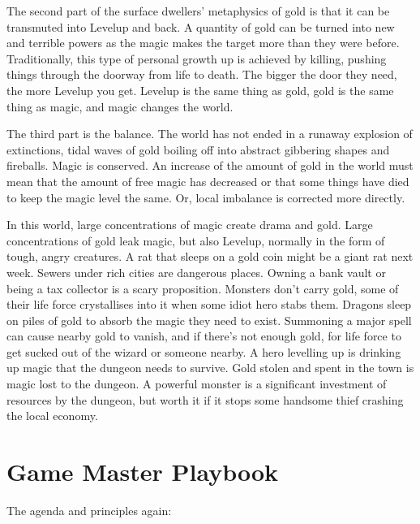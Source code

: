 \documentclass{tufte-book}
\begin{document}
The second part of the surface dwellers' metaphysics of gold is that it can be transmuted into Levelup and back. A quantity of gold can be turned into new and terrible powers as the magic makes the target more than they were before. Traditionally, this type of personal growth up is achieved by killing, pushing things through the doorway from life to death. The bigger the door they need, the more Levelup you get. Levelup is the same thing as gold, gold is the same thing as magic, and magic changes the world.

The third part is the balance. The world has not ended in a runaway explosion of extinctions, tidal waves of gold boiling off into abstract gibbering shapes and fireballs. Magic is conserved. An increase of the amount of gold in the world must mean that the amount of free magic has decreased or that some things have died to keep the magic level the same. Or, local imbalance is corrected more directly.

In this world, large concentrations of magic create drama and gold. Large concentrations of gold leak magic, but also Levelup, normally in the form of tough, angry creatures. A rat that sleeps on a gold coin might be a giant rat next week. Sewers under rich cities are dangerous places. Owning a bank vault or being a tax collector is a scary proposition. Monsters don't carry gold, some of their life force crystallises into it when some idiot hero stabs them. Dragons sleep on piles of gold to absorb the magic they need to exist. Summoning a major spell can cause nearby gold to vanish, and if there's not enough gold, for life force to get sucked out of the wizard or someone nearby. A hero levelling up is drinking up magic that the dungeon needs to survive. Gold stolen and spent in the town is magic lost to the dungeon. A powerful monster is a significant investment of resources by the dungeon, but worth it if it stops some handsome thief crashing the local economy.















\chapter{Game Master Playbook}

The agenda and principles again:
\end{document}
